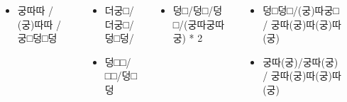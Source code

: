 \documentclass[	20pt, 
							a1paper, 
							portrait, %
							margin=0mm, %
							innermargin=10mm,  		%
							blockverticalspace=4mm, %
							colspace=5mm, 
							subcolspace=0mm
							]{tikzposter}
\begin{document}
\begin{columns}
		{
			\setlength{\leftmargini}{2em}			
			\setlength{\labelsep}{1em} 
			\begin{LARGE}
			\begin{itemize}
			\item 궁따따 / (궁)따따 / 궁□덩□덩
			\end{itemize}
			\end{LARGE}
		}


		{
			\setlength{\leftmargini}{2em}			
			\setlength{\labelsep}{1em} 
			\begin{LARGE}
			\begin{itemize}
			\item 더궁□/더궁□/덩□덩/
			\item 덩□□/□□/덩□덩
			\end{itemize}
			\end{LARGE}
		}

		{
			\setlength{\leftmargini}{2em}			
			\setlength{\labelsep}{1em} 
			\begin{LARGE}
			\begin{itemize}
			\item 덩□/덩□/덩□/(궁따궁따궁) * 2
			\end{itemize}
			\end{LARGE}
		}


		{
			\setlength{\leftmargini}{2em}			
			\setlength{\labelsep}{1em} 
			\begin{LARGE}
			\begin{itemize}
			\item 덩□덩□/(궁)따궁□ / 궁따(궁)따(궁)따(궁)
			\item 궁따(궁)/궁따(궁) / 궁따(궁)따(궁)따(궁)
			\end{itemize}
			\end{LARGE}
		}





		{

			\setlength{\leftmargini}{2em}			
			\setlength{\labelsep}{1em} 
			\begin{LARGE}
			\begin{itemize}


\end{itemize}
\end{LARGE}}
\end{columns}
\end{document}
